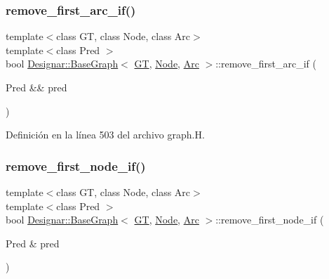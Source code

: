 \subsubsection{\texorpdfstring{remove\+\_\+first\+\_\+arc\+\_\+if()}{remove\_first\_arc\_if()}\hspace{0.1cm}{\footnotesize\ttfamily [2/2]}}
{\footnotesize\ttfamily template$<$class GT, class Node, class Arc$>$ \\
template$<$class Pred $>$ \\
bool \hyperlink{class_designar_1_1_base_graph}{Designar\+::\+Base\+Graph}$<$ \hyperlink{demo-buildgraph_8_c_a3001c40d2c31ca87ed96cd7d1334a55e}{GT}, \hyperlink{namespace_designar_a5af326c65aa2bd26b26c410f2030d09e}{Node}, \hyperlink{namespace_designar_a3f55fb5513d62ff47cbc8f72b8e95d6f}{Arc} $>$\+::remove\+\_\+first\+\_\+arc\+\_\+if (\begin{DoxyParamCaption}\item[{Pred \&\&}]{pred }\end{DoxyParamCaption})\hspace{0.3cm}{\ttfamily [inline]}}



Definición en la línea 503 del archivo graph.\+H.

\mbox{\label{class_designar_1_1_base_graph_a1311af417ba4d373d7051b73cc2696ec}} 
\subsubsection{\texorpdfstring{remove\+\_\+first\+\_\+node\+\_\+if()}{remove\_first\_node\_if()}\hspace{0.1cm}{\footnotesize\ttfamily [1/2]}}
{\footnotesize\ttfamily template$<$class GT, class Node, class Arc$>$ \\
template$<$class Pred $>$ \\
bool \hyperlink{class_designar_1_1_base_graph}{Designar\+::\+Base\+Graph}$<$ \hyperlink{demo-buildgraph_8_c_a3001c40d2c31ca87ed96cd7d1334a55e}{GT}, \hyperlink{namespace_designar_a5af326c65aa2bd26b26c410f2030d09e}{Node}, \hyperlink{namespace_designar_a3f55fb5513d62ff47cbc8f72b8e95d6f}{Arc} $>$\+::remove\+\_\+first\+\_\+node\+\_\+if (\begin{DoxyParamCaption}\item[{Pred \&}]{pred }\end{DoxyParamCaption})\hspace{0.3cm}{\ttfamily [inline]}}



